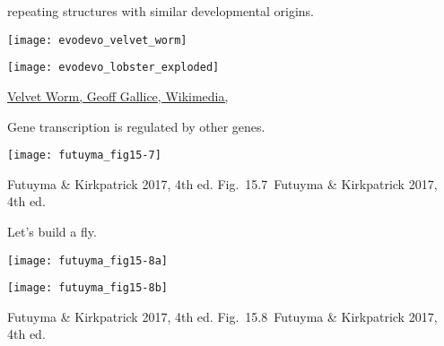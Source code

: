 \documentclass[t]{beamer}
\newcommand{\futuyma}[1]{%
	\ifthenelse{\isempty{#1}}%
	{Futuyma \& Kirkpatrick 2017, 4th ed.}%
	{Fig.~#1~Futuyma \& Kirkpatrick 2017, 4th ed.}%
}
\newcommand{\backskip}{\vspace{-0.5\baselineskip}}
\begin{document}
\begin{frame}{ repeating structures with similar developmental origins.}

\vspace{-\baselineskip}

\begin{multicols}{2}

\centering

\texttt{[image: evodevo\_velvet\_worm]}

\columnbreak

\vspace*{-2\baselineskip}

\texttt{[image: evodevo\_lobster\_exploded]}

\end{multicols}

\vfilll

\tiny\href{https://commons.wikimedia.org/wiki/File:Velvet_worm.jpg}{Velvet Worm, Geoff Gallice, Wikimedia, }

	
\end{frame}


\begin{frame}{Gene transcription is regulated by other genes.}

\backskip


\centering

\texttt{[image: futuyma\_fig15-7]}

\tinyfill \futuyma{15.7}


\end{frame}


\begin{frame}{Let's build a fly.}

\backskip

\begin{multicols}{2}

\texttt{[image: futuyma\_fig15-8a]}

\columnbreak

\texttt{[image: futuyma\_fig15-8b]}

\end{multicols}

\tinyfill \futuyma{15.8}

\end{frame}
\end{document}
